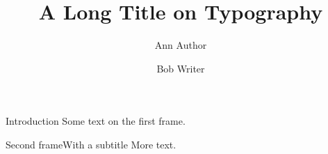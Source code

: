 \documentclass{beamer}
\title[Typography gyp]{A Long Title on Typography}
\author{Ann Author \and Bob Writer}
\begin{document}
\begin{frame}{Introduction}
Some text on the first frame.
\end{frame}
\begin{frame}{Second frame}{With a subtitle}
More text.
\end{frame}
\end{document}
